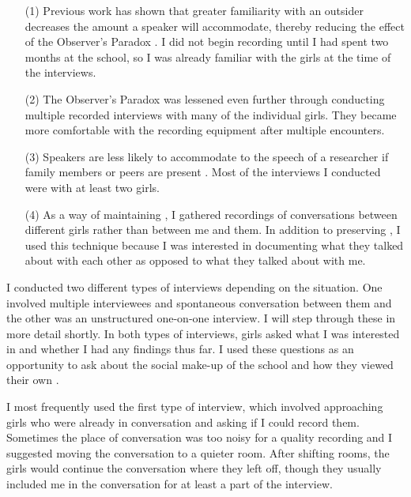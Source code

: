 \begin{enumerate}

\item[(1)] Previous work has shown that greater familiarity with an outsider decreases the amount a speaker will accommodate, thereby reducing the effect of the Observer's Paradox \citep{cukoravilabailey}. I did not begin recording until I had spent two months at the school, so I was already familiar with the girls at the time of the interviews.

\item[(2)] The Observer's Paradox was lessened even further through conducting multiple recorded interviews with many of the individual girls. They became more comfortable with the recording equipment after multiple encounters. 

\item[(3)] Speakers are less likely to accommodate to the speech of a researcher if family members or peers are present \citep[115]{labov1972principles}. Most of the interviews I conducted were with at least two girls.

\item[(4)] As a way of maintaining , I gathered recordings of conversations between different girls rather than between me and them. In addition to preserving , I used this technique because I was interested in documenting what they talked about with each other as opposed to what they talked about with me. 
\end{enumerate}

\noindent I conducted two different types of interviews depending on the situation. One involved multiple interviewees and spontaneous conversation between them and the other was an unstructured one-on-one interview. I will step through these in more detail shortly. In both types of interviews, girls asked what I was interested in and whether I had any findings thus far. I used these questions as an opportunity to ask about the social make-up of the school and how they viewed their own . 

I most frequently used the first type of interview, which involved approaching girls who were already in conversation and asking if I could record them. Sometimes the place of conversation was too noisy for a quality recording and I suggested moving the conversation to a quieter room. After shifting rooms, the girls would continue the conversation where they left off, though they usually included me in the conversation for at least a part of the interview.  

